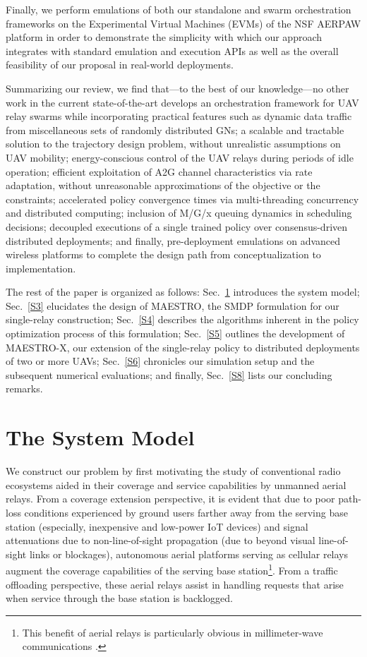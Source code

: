 \documentclass[12pt, draftcls, onecolumn]{IEEEtran}
\theoremstyle{plain}
\theoremstyle{definition}
\theoremstyle{remark}
\begin{document}
Finally, we perform emulations of both our standalone and swarm orchestration frameworks on the Experimental Virtual Machines (EVMs) of the NSF AERPAW platform \cite{AERPAW} in order to demonstrate the simplicity with which our approach integrates with standard emulation and execution APIs as well as the overall feasibility of our proposal in real-world deployments.

Summarizing our review, we find that---to the best of our knowledge---no other work in the current state-of-the-art develops an orchestration framework for UAV relay swarms while incorporating practical features such as dynamic data traffic from miscellaneous sets of randomly distributed GNs; a scalable and tractable solution to the trajectory design problem, without unrealistic assumptions on UAV mobility; energy-conscious control of the UAV relays during periods of idle operation; efficient exploitation of A2G channel characteristics via rate adaptation, without unreasonable approximations of the objective or the constraints; accelerated policy convergence times via multi-threading concurrency and distributed computing; inclusion of M/G/x queuing dynamics in scheduling decisions; decoupled executions of a single trained policy over consensus-driven distributed deployments; and finally, pre-deployment emulations on advanced wireless platforms to complete the design path from conceptualization to implementation.

The rest of the paper is organized as follows: Sec.~\ref{S2} introduces the system model; Sec.~\ref{S3} elucidates the design of MAESTRO, the SMDP formulation for our single-relay construction; Sec.~\ref{S4} describes the algorithms inherent in the policy optimization process of this formulation; Sec.~\ref{S5} outlines the development of MAESTRO-X, our extension of the single-relay policy to distributed deployments of two or more UAVs; Sec.~\ref{S6} chronicles our simulation setup and the subsequent numerical evaluations; and finally, Sec.~\ref{S8} lists our concluding remarks.
\vspace{-4mm}


\section{The System Model}\label{S2}
\vspace{-2mm}

We construct our problem by first motivating the study of conventional radio ecosystems aided in their coverage and service capabilities by unmanned aerial relays. From a coverage extension perspective, it is evident that due to poor path-loss conditions experienced by ground users farther away from the serving base station (especially, inexpensive and low-power IoT devices) and signal attenuations due to non-line-of-sight propagation (due to beyond visual line-of-sight links or blockages), autonomous aerial platforms serving as cellular relays augment the coverage capabilities of the serving base station\footnote{This benefit of aerial relays is particularly obvious in millimeter-wave communications \cite{NRSM}.}. From a traffic offloading perspective, these aerial relays assist in handling requests that arise when service through the base station is backlogged. 
\end{document}

